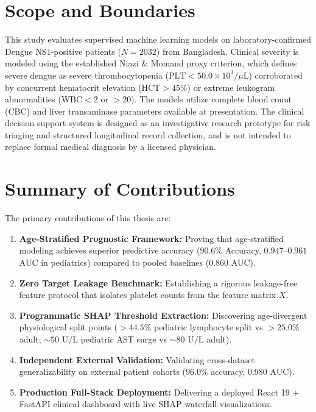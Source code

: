 \documentclass[12pt, a4paper]{report}
\begin{document}
\section{Scope and Boundaries}
This study evaluates supervised machine learning models on laboratory-confirmed Dengue NS1-positive patients ($N=2032$) from Bangladesh. Clinical severity is modeled using the established Niazi \& Momand proxy criterion, which defines severe dengue as severe thrombocytopenia ($\text{PLT} < 50.0 \times 10^3/\mu\text{L}$) corroborated by concurrent hematocrit elevation ($\text{HCT} > 45\%$) or extreme leukogram abnormalities ($\text{WBC} < 2$ or $> 20$). The models utilize complete blood count (CBC) and liver transaminase parameters available at presentation. The clinical decision support system is designed as an investigative research prototype for risk triaging and structured longitudinal record collection, and is not intended to replace formal medical diagnosis by a licensed physician.

\section{Summary of Contributions}
The primary contributions of this thesis are:
\begin{enumerate}
    \item \textbf{Age-Stratified Prognostic Framework:} Proving that age-stratified modeling achieves superior predictive accuracy ($90.6\%$ Accuracy, $0.947\text{--}0.961$ AUC in pediatrics) compared to pooled baselines ($0.860$ AUC).
    \item \textbf{Zero Target Leakage Benchmark:} Establishing a rigorous leakage-free feature protocol that isolates platelet counts from the feature matrix $X$.
    \item \textbf{Programmatic SHAP Threshold Extraction:} Discovering age-divergent physiological split points ($> 44.5\%$ pediatric lymphocyte split vs $> 25.0\%$ adult; $\sim 50\text{ U/L}$ pediatric AST surge vs $\sim 80\text{ U/L}$ adult).
    \item \textbf{Independent External Validation:} Validating cross-dataset generalizability on external patient cohorts ($96.0\%$ accuracy, $0.980$ AUC).
    \item \textbf{Production Full-Stack Deployment:} Delivering a deployed React 19 + FastAPI clinical dashboard with live SHAP waterfall visualizations.
\end{enumerate}

\end{document}
